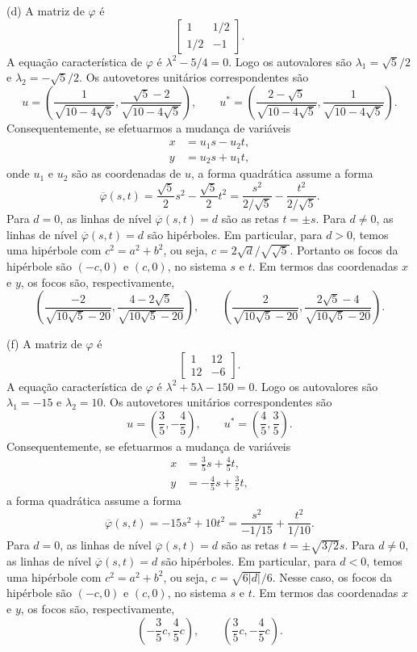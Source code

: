 \documentclass[a4paper,11pt]{article}
\begin{document}
(d)
A matriz de $\varphi$ é
\[
  \begin{bmatrix}
    1 & 1/2 \\
    1/2 & -1
  \end{bmatrix}.
\]
A equação característica de $\varphi$ é $\lambda^2 - 5/4 = 0$.
Logo os autovalores são $\lambda_1 = \sqrt{5}/2$ e $\lambda_2 = -\sqrt{5}/2$.
Os autovetores unitários correspondentes são
\[
  u = \left( \frac{1}{\sqrt{10 - 4\sqrt{5}}}, \frac{\sqrt{5}-2}{\sqrt{10 - 4\sqrt{5}}} \right), \qquad u^* = \left( \frac{2-\sqrt{5}}{\sqrt{10 - 4\sqrt{5}}}, \frac{1}{\sqrt{10 - 4\sqrt{5}}} \right).
\]
Consequentemente, se efetuarmos a mudança de variáveis
\begin{align*}
  x & = u_1 s - u_2 t, \\
  y & = u_2 s + u_1 t,
\end{align*}
onde $u_1$ e $u_2$ são as coordenadas de $u$, a forma quadrática assume a forma
\[
  \overline{\varphi}(s,t) = \frac{\sqrt{5}}{2} s^2 - \frac{\sqrt{5}}{2} t^2 = \frac{s^2}{2/\sqrt{5}} - \frac{t^2}{2/\sqrt{5}}.
\]
Para $d = 0$, as linhas de nível $\overline{\varphi}(s,t) = d$ são as retas $t = \pm s$.
Para $d \neq 0$, as linhas de nível $\overline{\varphi}(s,t) = d$ são hipérboles.
Em particular, para $d > 0$, temos uma hipérbole com $c^2 = a^2 + b^2$, ou seja, $c = 2\sqrt{d}/\sqrt{\sqrt{5}}$.
Portanto os focos da hipérbole são $(-c,0)$ e $(c,0)$, no sistema $s$ e $t$.
Em termos das coordenadas $x$ e $y$, os focos são, respectivamente,
\[
  \left( \frac{-2}{\sqrt{10 \sqrt{5} - 20}}, \frac{4-2\sqrt{5}}{\sqrt{10 \sqrt{5} - 20}} \right), \qquad \left( \frac{2}{\sqrt{10 \sqrt{5} - 20}}, \frac{2\sqrt{5}-4}{\sqrt{10 \sqrt{5} - 20}} \right).
\]

(f)
A matriz de $\varphi$ é
\[
  \begin{bmatrix}
    1 & 12 \\
    12 & -6
  \end{bmatrix}.
\]
A equação característica de $\varphi$ é $\lambda^2 + 5\lambda - 150 = 0$.
Logo os autovalores são $\lambda_1 = -15$ e $\lambda_2 = 10$.
Os autovetores unitários correspondentes são
\[
  u = \left( \frac{3}{5}, -\frac{4}{5} \right), \qquad u^* = \left( \frac{4}{5}, \frac{3}{5} \right).
\]
Consequentemente, se efetuarmos a mudança de variáveis
\begin{align*}
  x & = \frac{3}{5} s + \frac{4}{5} t, \\
  y & = -\frac{4}{5} s + \frac{3}{5} t,
\end{align*}
a forma quadrática assume a forma
\[
  \overline{\varphi}(s,t) = -15 s^2 + 10 t^2 = \frac{s^2}{-1/15} + \frac{t^2}{1/10}.
\]
Para $d = 0$, as linhas de nível $\overline{\varphi}(s,t) = d$ são as retas $t = \pm \sqrt{3/2} s$.
Para $d \neq 0$, as linhas de nível $\overline{\varphi}(s,t) = d$ são hipérboles.
Em particular, para $d < 0$, temos uma hipérbole com $c^2 = a^2 + b^2$, ou seja, $c = \sqrt{6|d|}/6$.
Nesse caso, os focos da hipérbole são $(-c,0)$ e $(c,0)$, no sistema $s$ e $t$.
Em termos das coordenadas $x$ e $y$, os focos são, respectivamente,
\[
  \left( -\frac{3}{5} c, \frac{4}{5}c \right), \qquad \left( \frac{3}{5}c, -\frac{4}{5}c \right).
\]
\end{document}
